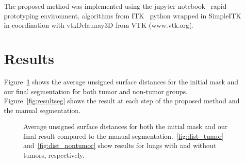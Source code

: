 \documentclass{llncs}
\begin{document}
The proposed method was implemented using the jupyter notebook~\cite{PER-GRA:2007} rapid prototyping environment,  algorithms from ITK~\cite{johnson2015itk} python wrapped in SimpleITK~\cite{10.3389/fninf.2013.00045} in coordination with vtkDelaunay3D from VTK (www.vtk.org).


%
\section{Results}
%
Figure~\ref{fig:dist} shows the average unsigned surface distances for the initial mask and our final segmentation for both tumor and non-tumor groups. Figure~\ref{fig:resultseg} shows the result at each step of the proposed method and the manual segmentation. 
\begin{figure}[ht!]
  \centering
  \caption{Average unsigned surface distances for both the initial mask and our final result compared to the manual segmentation.~\ref{fig:dist_tumor} and~\ref{fig:dist_nontumor} show results for lungs with and without tumors, respectively.}
  \label{fig:dist}
\end{figure}
\end{document}

